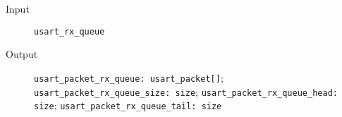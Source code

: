 \begin{flushleft}
  \begin{description}
    \item [Input]
      \verb#usart_rx_queue#
    \item [Output]
      \verb#usart_packet_rx_queue: usart_packet[]#;
      \verb#usart_packet_rx_queue_size: size#;
      \verb#usart_packet_rx_queue_head: size#;
      \verb#usart_packet_rx_queue_tail: size#
  \end{description}
\end{flushleft}
